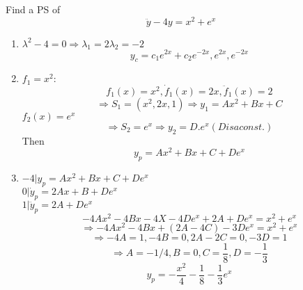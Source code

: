 \documentclass[12pt,a4paper]{article}
\begin{document}
    \begin{exmp}
        Find a PS of $$\ddot y-4y=x^2+e^x$$
    \end{exmp}
    \begin{hSolution}
        \begin{enumerate}
            \item 
                $\lambda^2-4=0 \Rightarrow \lambda_1=2 \lambda_2=-2$
                $$y_c=c_1 e^{2x}+c_2 e^{-2x}, {e^{2x}, e^{-2x}}$$
            \item 
                $f_1=x^2:$ $$f_1(x)=x^2,\dot f_1(x)=2x, \ddot f_1(x)=2$$
                $$\Rightarrow S_1=(x^2,2x,1)\Rightarrow y_1=Ax^2+Bx+C$$
                $f_2(x)=e^x$
                $$\Rightarrow S_2={e^x} \Rightarrow y_2=D.e^x (D is a const.)$$
                Then $$y_p = Ax^2+Bx+C+De^x$$
            \item
                $-4 | y_p=Ax^2+Bx+C+De^x$\\
                $0 | \dot y_p=2Ax+B+De^x$\\
                $1 | \ddot y_p = 2A+De^x$
                $$-4Ax^2-4Bx-4X-4De^x+2A+De^x=x^2+e^x$$
                $$\Rightarrow -4Ax^2-4Bx+(2A-4C)-3De^x=x^2+e^x$$
                $$\Rightarrow -4A=1,-4B=0,2A-2C=0,-3D=1$$
                $$\Rightarrow A=-1/4, B=0, C=\frac{1}{8},D=-\frac{1}{3}$$
                $$y_p=-\frac{x^2}{4}-\frac{1}{8}-\frac{1}{3}e^x$$
        \end{enumerate}
    
    \end{hSolution}
\end{document}
